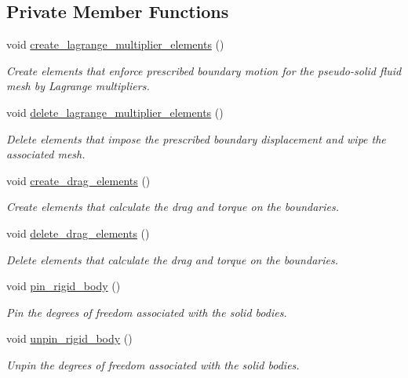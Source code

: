 \subsection*{Private Member Functions}
\begin{DoxyCompactItemize}
\item 
void \hyperlink{classUnstructuredImmersedEllipseProblem_a3b4a4e279a11b37d79d040b348008765}{create\+\_\+lagrange\+\_\+multiplier\+\_\+elements} ()
\begin{DoxyCompactList}\small\item\em Create elements that enforce prescribed boundary motion for the pseudo-\/solid fluid mesh by Lagrange multipliers. \end{DoxyCompactList}\item 
void \hyperlink{classUnstructuredImmersedEllipseProblem_a51555f77dc360c94591ee68c3fc9928a}{delete\+\_\+lagrange\+\_\+multiplier\+\_\+elements} ()
\begin{DoxyCompactList}\small\item\em Delete elements that impose the prescribed boundary displacement and wipe the associated mesh. \end{DoxyCompactList}\item 
void \hyperlink{classUnstructuredImmersedEllipseProblem_a16a7c6022867f709ebdd59b8fee2004a}{create\+\_\+drag\+\_\+elements} ()
\begin{DoxyCompactList}\small\item\em Create elements that calculate the drag and torque on the boundaries. \end{DoxyCompactList}\item 
void \hyperlink{classUnstructuredImmersedEllipseProblem_a7d7b84968988d37091b29957b0af5bfa}{delete\+\_\+drag\+\_\+elements} ()
\begin{DoxyCompactList}\small\item\em Delete elements that calculate the drag and torque on the boundaries. \end{DoxyCompactList}\item 
void \hyperlink{classUnstructuredImmersedEllipseProblem_a07dc16909c0223fe4b656fd270f27c11}{pin\+\_\+rigid\+\_\+body} ()
\begin{DoxyCompactList}\small\item\em Pin the degrees of freedom associated with the solid bodies. \end{DoxyCompactList}\item 
void \hyperlink{classUnstructuredImmersedEllipseProblem_a4f8c7e7e4d626084f6515a152b165567}{unpin\+\_\+rigid\+\_\+body} ()
\begin{DoxyCompactList}\small\item\em Unpin the degrees of freedom associated with the solid bodies. \end{DoxyCompactList}\end{DoxyCompactItemize}

